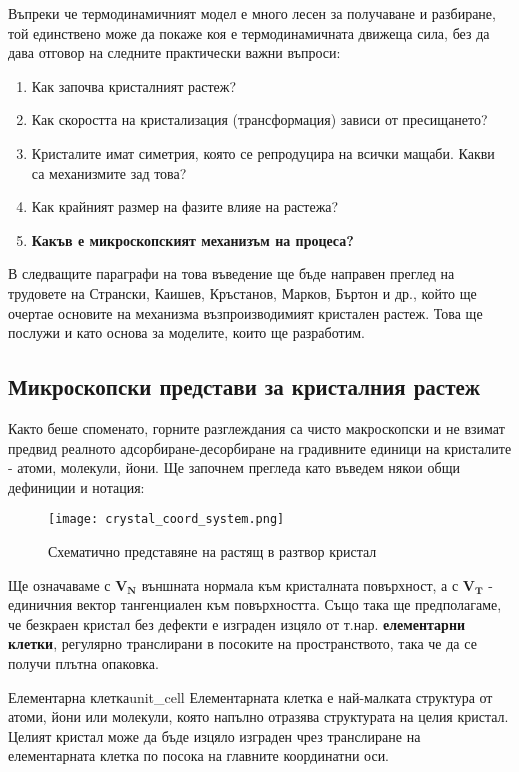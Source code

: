 Въпреки че термодинамичният модел е много лесен за получаване и разбиране, той единствено може да покаже коя е термодинамичната движеща сила, без да дава отговор на следните практически важни въпроси:
\begin{enumerate}
	\item Как започва кристалният растеж?
	\item Как скоростта на кристализация (трансформация) зависи от пресищането?
	\item Кристалите имат симетрия, която се репродуцира на всички мащаби. Какви са механизмите зад това?
	\item Как крайният размер на фазите влияе на растежа?
	\item \textbf{Какъв е микроскопският механизъм на процеса?}
\end{enumerate}

В следващите параграфи на това въведение ще бъде направен преглед на трудовете на Странски, Каишев, Кръстанов, Марков, Бъртон и др., който ще очертае основите на механизма възпроизводимият кристален растеж. Това ще послужи и като основа за моделите, които ще разработим.

\subsection{Микроскопски представи за кристалния растеж}
\label{sub:microscopic_growth}
Както беше споменато, горните разглеждания са чисто макроскопски и не взимат предвид реалното адсорбиране-десорбиране на градивните единици на кристалите - атоми, молекули, йони. Ще започнем прегледа като въведем някои общи дефиниции и нотация:
\begin{figure}[htbp]
	\centering
	\texttt{[image: crystal\_coord\_system.png]}
	\caption{Схематично представяне на растящ в разтвор кристал}
\end{figure}

\noindent Ще означаваме с $\boldsymbol{V_{N}}$ външната нормала към кристалната повърхност, а с $\boldsymbol{V_{T}}$ - единичния вектор тангенциален към повърхността. Също така ще предполагаме, че безкраен кристал без дефекти е изграден изцяло от т.нар. \textbf{елементарни клетки}, регулярно транслирани в посоките на пространството, така че да се получи плътна опаковка.

\begin{definition}{Елементарна клетка}{unit_cell}
    Елементарната клетка е най-малката структура от атоми, йони или молекули, която напълно отразява структурата на целия кристал. Целият кристал може да бъде изцяло изграден чрез транслиране на елементарната клетка по посока на главните координатни оси.
\end{definition}

